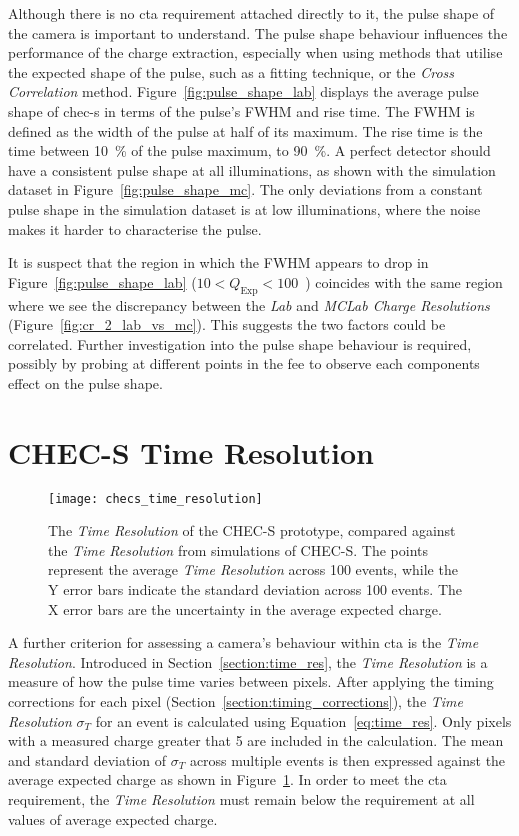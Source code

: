 Although there is no \gls{cta} requirement attached directly to it, the pulse shape of the camera is important to understand. The pulse shape behaviour influences the performance of the charge extraction, especially when using methods that utilise the expected shape of the pulse, such as a fitting technique, or the \textit{Cross Correlation} method. Figure~\ref{fig:pulse_shape_lab} displays the average pulse shape of \gls{chec-s} in terms of the pulse's FWHM and rise time. The FWHM is defined as the width of the pulse at half of its maximum. The rise time is the time between \SI{10}{\percent} of the pulse maximum, to \SI{90}{\percent}. A perfect detector should have a consistent pulse shape at all illuminations, as shown with the simulation dataset in Figure~\ref{fig:pulse_shape_mc}. The only deviations from a constant pulse shape in the simulation dataset is at low illuminations, where the noise makes it harder to characterise the pulse. 

It is suspect that the region in which the FWHM appears to drop in Figure~\ref{fig:pulse_shape_lab} ($10 < Q_\text{Exp} < 100$~\si{\pe}) coincides with the same region where we see the discrepancy between the \textit{Lab} and \textit{MCLab Charge Resolutions} (Figure~\ref{fig:cr_2_lab_vs_mc}). This suggests the two factors could be correlated. Further investigation into the pulse shape behaviour is required, possibly by probing at different points in the \gls{fee} to observe each components effect on the pulse shape. 

\section{CHEC-S Time Resolution}

\begin{figure}
	\centering
    \texttt{[image: checs\_time\_resolution]} 
	\caption[CHEC-S \textit{Time Resolution}.]{The \textit{Time Resolution} of the CHEC-S prototype, compared against the \textit{Time Resolution} from simulations of CHEC-S. The points represent the average \textit{Time Resolution} across 100 events, while the Y error bars indicate the standard deviation across 100 events. The X error bars are the uncertainty in the average expected charge.}
	\label{fig:checs_time_resolution}
\end{figure}

A further criterion for assessing a camera's behaviour within \gls{cta} is the \textit{Time Resolution}. Introduced in Section~\ref{section:time_res}, the \textit{Time Resolution} is a measure of how the pulse time varies between pixels. After applying the timing corrections for each pixel (Section~\ref{section:timing_corrections}), the \textit{Time Resolution} $\sigma_T$ for an event is calculated using Equation~\ref{eq:time_res}. Only pixels with a measured charge greater that \SI{5}{\pe} are included in the calculation. The mean and standard deviation of $\sigma_T$ across multiple events is then expressed against the average expected charge as shown in Figure~\ref{fig:checs_time_resolution}. In order to meet the \gls{cta} requirement, the \textit{Time Resolution} must remain below the requirement at all values of average expected charge.

